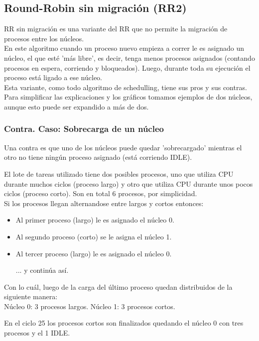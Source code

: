 \subsection{Round-Robin sin migración (RR2)}

RR sin migración es una variante del RR que no permite la migración de procesos
entre los núcleos.\\

En este algoritmo cuando un proceso nuevo empieza a correr le es asignado
un núcleo, el que esté 'más libre', es decir, tenga menos procesos asignados
(contando procesos en espera, corriendo y bloqueados).
Luego, durante toda su ejecución el proceso está ligado a ese núcleo.\\

Esta variante, como todo algoritmo de schedulling, tiene sus pros y sus contras.\\
Para simplificar las explicaciones y los gráficos tomamos ejemplos de 
dos núcleos, aunque esto puede ser expandido a más de dos.\\

\subsubsection{Contra. Caso: Sobrecarga de un núcleo}
Una contra es que uno de los núcleos puede quedar 'sobrecargado' mientras el
otro no tiene ningún proceso asignado (está corriendo IDLE).

El lote de tareas utilizado tiene dos posibles procesos, uno que utiliza CPU durante muchos ciclos (proceso largo)
y otro que utiliza CPU durante unos pocos ciclos (proceso corto). Son en total 6 procesos, por simplicidad.\\
Si los procesos llegan alternandose entre largos y cortos entonces:
\begin{itemize}
\item Al primer proceso (largo) le es asignado el núcleo 0.
\item Al segundo proceso (corto) se le asigna el núcleo 1.
\item Al tercer proceso (largo) le es asignado el núcleo 0.

... y continúa así.
\end{itemize}

Con lo cuál, luego de la carga del último proceso quedan distribuidos de la siguiente manera:\\ 
Núcleo 0: 3 procesos largos. Núcleo 1: 3 procesos cortos.

En el ciclo 25 los procesos cortos son finalizados quedando el núcleo 0 con tres procesos y el 1 IDLE.\\

